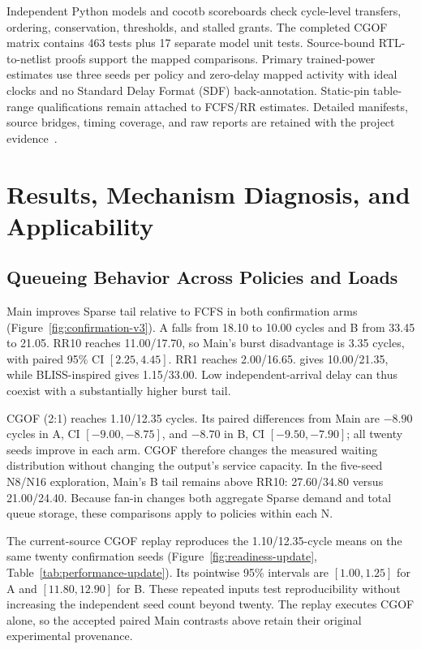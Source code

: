Independent Python models and cocotb scoreboards check cycle-level transfers, ordering, conservation, thresholds, and stalled grants. The completed CGOF matrix contains 463 tests plus 17 separate model unit tests. Source-bound RTL-to-netlist proofs support the mapped comparisons. Primary trained-power estimates use three seeds per policy and zero-delay mapped activity with ideal clocks and no Standard Delay Format (SDF) back-annotation. Static-pin table-range qualifications remain attached to FCFS/RR estimates. Detailed manifests, source bridges, timing coverage, and raw reports are retained with the project evidence~\cite{artifact}.

\section{Results, Mechanism Diagnosis, and Applicability}
\label{sec:results}
\subsection{Queueing Behavior Across Policies and Loads}
Main improves Sparse tail relative to FCFS in both confirmation arms (Figure~\ref{fig:confirmation-v3}). A falls from 18.10 to 10.00 cycles and B from 33.45 to 21.05. RR10 reaches 11.00/17.70, so Main's burst disadvantage is 3.35 cycles, with paired 95\% CI $[2.25,4.45]$. RR1 reaches 2.00/16.65. \Alg{} gives 10.00/21.35, while BLISS-inspired gives 1.15/33.00. Low independent-arrival delay can thus coexist with a substantially higher burst tail.

CGOF (2:1) reaches 1.10/12.35 cycles. Its paired differences from Main are $-8.90$ cycles in A, CI $[-9.00,-8.75]$, and $-8.70$ in B, CI $[-9.50,-7.90]$; all twenty seeds improve in each arm. CGOF therefore changes the measured waiting distribution without changing the output's service capacity. In the five-seed N8/N16 exploration, Main's B tail remains above RR10: 27.60/34.80 versus 21.00/24.40. Because fan-in changes both aggregate Sparse demand and total queue storage, these comparisons apply to policies within each N.

The current-source CGOF replay reproduces the 1.10/12.35-cycle means on the same twenty confirmation seeds (Figure~\ref{fig:readiness-update}, Table~\ref{tab:performance-update}). Its pointwise 95\% intervals are $[1.00,1.25]$ for A and $[11.80,12.90]$ for B. These repeated inputs test reproducibility without increasing the independent seed count beyond twenty. The replay executes CGOF alone, so the accepted paired Main contrasts above retain their original experimental provenance.

